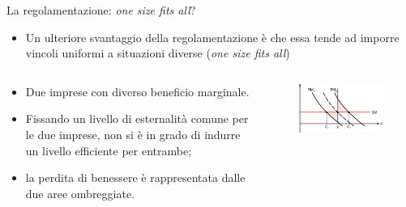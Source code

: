 \documentclass[aspectratio=64,11pt]{beamer}
\begin{document}
\begin{frame}{La regolamentazione: \emph{one size fits all}?}
\begin{itemize}
\item Un ulteriore svantaggio della regolamentazione è che essa tende ad imporre
vincoli uniformi a situazioni diverse (\emph{one size fits all})
\end{itemize}

\begin{columns}
\begin{column}{.5\columnwidth}
\begin{itemize}
\item Due imprese con diverso beneficio marginale.
\item Fissando un livello di esternalità comune per le due imprese, non si è in
grado di indurre un livello efficiente per entrambe;
\item la perdita di benessere è rappresentata dalle due aree ombreggiate.
\end{itemize}
\end{column}

\begin{column}{.5\columnwidth}
\begin{figure}[htbp]
\centering
\includegraphics[width=\textwidth]{./figure/esternalita-8-color.pdf}
\end{figure}
\end{column}
\end{columns}
\end{frame}
\end{document}
